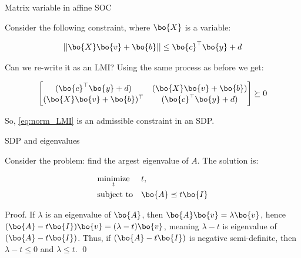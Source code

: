 \documentclass{beamer}
\begin{document}
\begin{frame}{Matrix variable in affine SOC}
	\begin{flushleft}
		
		Consider the following constraint, where $\bo{X}$ is a variable:
		
		\begin{equation}
			\label{eq:norm_LMI}
			||\bo{X}\bo{v} + \bo{b}|| \leq \bo{c}^\top \bo{y} + d
		\end{equation}
		
		Can we re-write it as an LMI? Using the same process as before we get:
		
		\begin{align}
			\begin{bmatrix}
	(\bo{c}^\top \bo{y} + d) & (\bo{X}\bo{v} + \bo{b}) \\
	(\bo{X}\bo{v} + \bo{b})^\top & (\bo{c}^\top \bo{y} + d)
		\end{bmatrix} \succeq 0
		\end{align}
	
		So, \eqref{eq:norm_LMI} is an admissible constraint in an SDP.
		
	\end{flushleft}
\end{frame}






\begin{frame}{SDP and eigenvalues}
	\begin{flushleft}
		
		Consider the problem: find the argest eigenvalue of $A$. The solution is:
		
		\begin{equation}
			\begin{aligned}
				& \underset{t}{\text{minimize}}
				& & t, \\
				& \text{subject to}
				& & \bo{A} \preceq t\bo{I}
			\end{aligned}
		\end{equation}
		
		Proof. If $\lambda$ is an eigenvalue of $\bo{A}$, then $\bo{A} \bo{v} = \lambda\bo{v}$, hence $(\bo{A} - t\bo{I}) \bo{v} = (\lambda - t)\bo{v}$, meaning $\lambda - t$ is eigenvalue of $(\bo{A} - t\bo{I})$. Thus, if $(\bo{A} - t\bo{I})$ is negative semi-definite, then $\lambda - t \leq 0$ and $\lambda \leq t$. \qed
		
		
	\end{flushleft}
\end{frame}
\end{document}
